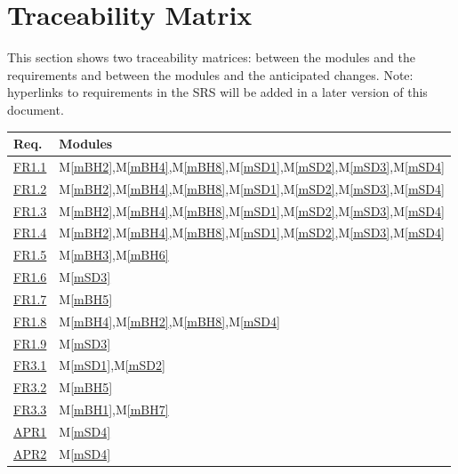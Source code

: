 \documentclass[12pt, titlepage]{article}
\newcommand{\mref}[1]{M\ref{#1}}
\begin{document}
\section{Traceability Matrix} \label{SecTM}

This section shows two traceability matrices: between the modules and the
requirements and between the modules and the anticipated changes. Note: hyperlinks to requirements in the SRS will be added in a later version of this document.

\begin{table}[H]
\centering
\begin{tabular}{p{} p{}}
\toprule
\textbf{Req.} & \textbf{Modules}\\
\midrule
  \href{../../SRS/SRS.pdf#FROneOne}{ FR1.1 } & \mref{mBH2},\mref{mBH4},\mref{mBH8},\mref{mSD1},\mref{mSD2},\mref{mSD3},\mref{mSD4}\\
  \href{../../SRS/SRS.pdf#FROneTwo}{ FR1.2 } & \mref{mBH2},\mref{mBH4},\mref{mBH8},\mref{mSD1},\mref{mSD2},\mref{mSD3},\mref{mSD4}\\
  \href{../../SRS/SRS.pdf#FROneThree}{ FR1.3 } & \mref{mBH2},\mref{mBH4},\mref{mBH8},\mref{mSD1},\mref{mSD2},\mref{mSD3},\mref{mSD4}\\
  \href{../../SRS/SRS.pdf#FROneFour}{ FR1.4 } & \mref{mBH2},\mref{mBH4},\mref{mBH8},\mref{mSD1},\mref{mSD2},\mref{mSD3},\mref{mSD4}\\
  \href{../../SRS/SRS.pdf#FROneFive}{ FR1.5 } & \mref{mBH3},\mref{mBH6}\\
  \href{../../SRS/SRS.pdf#FROneSix}{ FR1.6 } & \mref{mSD3}\\
  \href{../../SRS/SRS.pdf#FROneSeven}{ FR1.7 } & \mref{mBH5}\\
  \href{../../SRS/SRS.pdf#FROneEight}{ FR1.8 } & \mref{mBH4},\mref{mBH2},\mref{mBH8},\mref{mSD4}\\
  \href{../../SRS/SRS.pdf#FROneNine}{ FR1.9 } & \mref{mSD3}\\
  \href{../../SRS/SRS.pdf#FRThreeOne}{ FR3.1 } & \mref{mSD1},\mref{mSD2}\\
  \href{../../SRS/SRS.pdf#FRThreeTwo}{ FR3.2 } & \mref{mBH5}\\
  \href{../../SRS/SRS.pdf#FRThreeThree}{ FR3.3 } & \mref{mBH1},\mref{mBH7}\\
  \href{../../SRS/SRS.pdf#APROne}{ APR1 } & \mref{mSD4}\\
  \href{../../SRS/SRS.pdf#APRTwo}{ APR2 } & \mref{mSD4}\\

\end{tabular}
\end{table}
\end{document}

